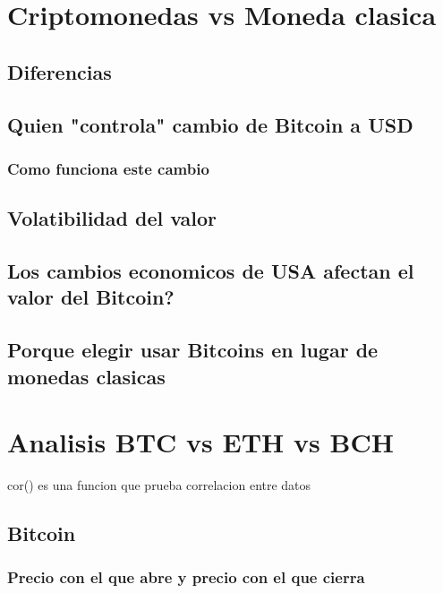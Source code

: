 \documentclass[12pt,letterpaper]{article}
\begin{document}
\section*{Criptomonedas vs Moneda clasica}

	\subsection*{Diferencias}
	
	\subsection*{Quien "controla" cambio de Bitcoin a USD}
	
		\subsubsection*{Como funciona este cambio}
        
	\subsection*{Volatibilidad del valor}

    \subsection*{Los cambios economicos de USA afectan el valor del Bitcoin?}

    \subsection*{Porque elegir usar Bitcoins en lugar de monedas clasicas}

\section*{Analisis BTC vs ETH vs BCH}

    cor() es una funcion que prueba correlacion entre datos

    \subsection*{Bitcoin}

    \subsubsection*{Precio con el que abre y precio con el que cierra}
\end{document}
